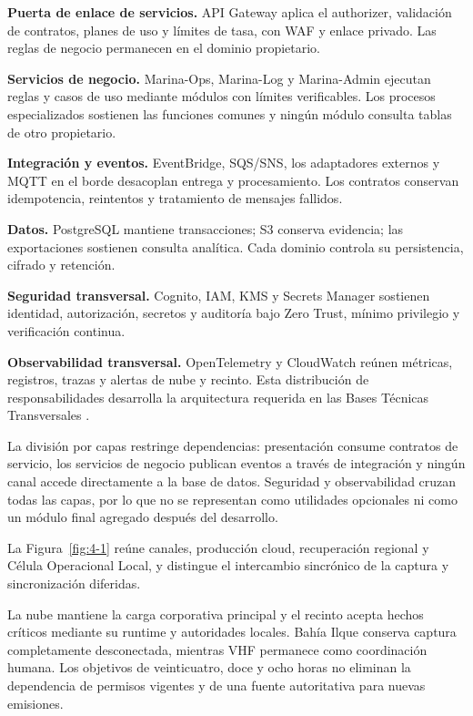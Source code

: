 \textbf{Puerta de enlace de servicios.} API Gateway aplica el authorizer, validación de contratos, planes de uso y límites de tasa, con WAF y enlace privado. Las reglas de negocio permanecen en el dominio propietario.

\textbf{Servicios de negocio.} Marina-Ops, Marina-Log y Marina-Admin ejecutan reglas y casos de uso mediante módulos con límites verificables. Los procesos especializados sostienen las funciones comunes y ningún módulo consulta tablas de otro propietario.

\textbf{Integración y eventos.} EventBridge, SQS/SNS, los adaptadores externos y MQTT en el borde desacoplan entrega y procesamiento. Los contratos conservan idempotencia, reintentos y tratamiento de mensajes fallidos.

\textbf{Datos.} PostgreSQL mantiene transacciones; S3 conserva evidencia; las exportaciones sostienen consulta analítica. Cada dominio controla su persistencia, cifrado y retención.

\textbf{Seguridad transversal.} Cognito, IAM, KMS y Secrets Manager sostienen identidad, autorización, secretos y auditoría bajo Zero Trust, mínimo privilegio y verificación continua.

\textbf{Observabilidad transversal.} OpenTelemetry y CloudWatch reúnen métricas, registros, trazas y alertas de nube y recinto. Esta distribución de responsabilidades desarrolla la arquitectura requerida en las Bases Técnicas Transversales \parencite[cap.~2, pp.~6--7]{pucv-transversal}.

La división por capas restringe dependencias: presentación consume contratos de servicio, los servicios de negocio publican eventos a través de integración y ningún canal accede directamente a la base de datos. Seguridad y observabilidad cruzan todas las capas, por lo que no se representan como utilidades opcionales ni como un módulo final agregado después del desarrollo.

La Figura~\ref{fig:4-1} reúne canales, producción cloud, recuperación regional y Célula Operacional Local, y distingue el intercambio sincrónico de la captura y sincronización diferidas.



La nube mantiene la carga corporativa principal y el recinto acepta hechos críticos mediante su runtime y autoridades locales. Bahía Ilque conserva captura completamente desconectada, mientras VHF permanece como coordinación humana. Los objetivos de veinticuatro, doce y ocho horas no eliminan la dependencia de permisos vigentes y de una fuente autoritativa para nuevas emisiones.


